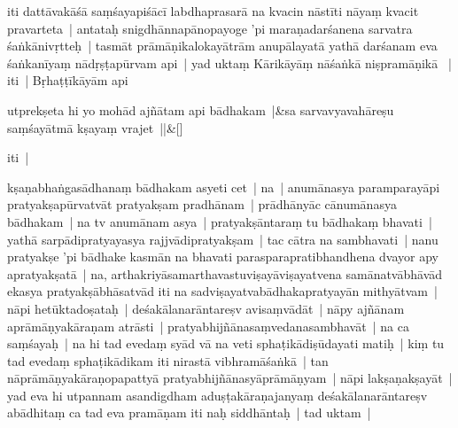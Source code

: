 \documentclass[article,12pt,a4paper]{memoir}%
\newcounter{parCount}
\begin{document}
	  \pstart \leavevmode%
	iti dattāvakāśā saṃśayapiśācī labdhaprasarā na kvacin nāstīti nāyaṃ kvacit pravarteta | antataḥ snigdhānnapānopayoge 'pi maraṇadarśanena sarvatra śaṅkānivṛtteḥ | tasmāt prāmāṇikalokayātrām anupālayatā yathā darśanam eva śaṅkanīyaṃ nādṛṣṭapūrvam api | \label{thakur75-112.18} yad uktaṃ Kārikāyāṃ nāśaṅkā niṣpramāṇikā  | iti | Bṛhaṭṭīkāyām api
	{}
	\pend%
      
	    
	    \stanza[\smallbreak]
	  utprekṣeta hi yo mohād ajñātam api bādhakam |&sa sarvavyavahāreṣu saṃśayātmā kṣayaṃ vrajet ||\&[\smallbreak]
	  
	  
	  

	  \pstart \leavevmode%
	iti |
	{}
	\pend%
      

	  \pstart \leavevmode%
	\label{thakur75-112.24}kṣaṇabhaṅgasādhanaṃ bādhakam asyeti cet | na | anumānasya paramparayāpi pratyakṣapūrvatvāt pratyakṣam pradhānam | prādhānyāc cānumānasya bādhakam | na tv anumānam asya | pratyakṣāntaraṃ tu bādhakaṃ bhavati | yathā sarpādipratyayasya rajjvādipratyakṣam | tac cātra na sambhavati | \label{thakur75-112.28} nanu pratyakṣe 'pi bādhake kasmān na bhavati parasparapratibhandhena dvayor apy apratyakṣatā | \label{thakur75-112.28a} na, arthakriyāsamarthavastuviṣayāviṣayatvena samānatvābhāvād ekasya pratyakṣābhāsatvād iti na sadviṣayatvabādhakapratyayān mithyātvam | \label{thakur75-113.1} nāpi hetūktadoṣataḥ | deśakālanarāntareṣv avisaṃvādāt | \label{thakur75-113.2} nāpy ajñānam aprāmāṇyakāraṇam atrāsti | pratyabhijñānasaṃvedanasambhavāt | \label{thakur75-113.3} na ca saṃśayaḥ | na hi tad evedaṃ syād vā na veti sphaṭikādiṣūdayati matiḥ | kiṃ tu tad evedaṃ sphaṭikādikam iti nirastā vibhramāśaṅkā | tan nāprāmāṇyakāraṇopapattyā pratyabhijñānasyāprāmāṇyam | \label{thakur75-113.5} nāpi lakṣaṇakṣayāt | yad eva hi utpannam asandigdham aduṣṭakāraṇajanyaṃ deśakālanarāntareṣv abādhitaṃ ca tad eva pramāṇam iti naḥ siddhāntaḥ | tad uktam |
	{}
	\pend%
      
\end{document}
